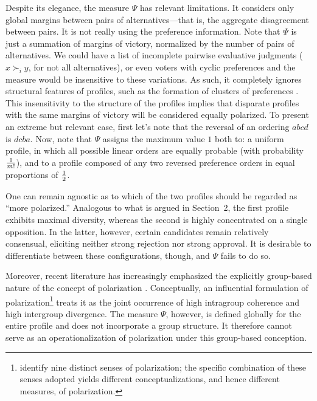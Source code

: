 \documentclass[12pt]{article}
\begin{document}
Despite its elegance, the measure \(\Psi\) has relevant limitations. It considers
only global margins between pairs of alternatives—that is, the aggregate
disagreement between pairs. It is not really using the preference information. Note that \(\Psi\) is just a summation of margins of victory, normalized by  the number of pairs of alternatives. We could have a list of incomplete pairwise evaluative judgments (\(x\succ_{i}y\), for not all alternatives), or even voters with cyclic preferences  and the measure would be insensitive to these variations. As such, it  completely ignores structural features of
profiles, such as the formation of clusters of preferences
\parencite{bramson16_disam_social_polar_concep_measur}. This insensitivity to the structure of the profiles implies that disparate profiles with the same margins of victory will be considered equally polarized. To present an extreme but relevant case, first let's note that the reversal of an ordering \( abcd \) is \( dcba \). Now,
note that \(\Psi\) assigns the maximum value \(1\) both to: a uniform profile, in
which all possible linear orders are equally probable (with probability \(1 \over {m!}\)), and to a profile
composed of any two reversed preference orders in equal proportions of \(1 \over 2\).

One can remain agnostic as to which of the two profiles should be regarded as
``more polarized.'' Analogous to what is argued in Section~2, the first profile
exhibits maximal diversity, whereas the second is highly concentrated on a
single opposition. In the latter, however, certain candidates remain
relatively consensual, eliciting neither strong rejection nor strong approval.
It is  desirable to differentiate between these configurations, though, and
\(\Psi\) fails to do so.

Moreover, recent literature has increasingly emphasized the explicitly
group-based nature of the concept of polarization
\parencite{mehlhaff23_group_based_approac_to_measur_polar,
  bramson2017understanding}. Conceptually, an influential formulation of
polarization\footnote{\textcite{bramson2017understanding, bramson16_disam_social_polar_concep_measur}
identify nine distinct senses of polarization; the specific combination of
these senses adopted yields different conceptualizations, and hence different
measures, of polarization.} treats it as the joint occurrence of high
intragroup coherence and high intergroup divergence. The measure \(\Psi\),
however, is defined globally for the entire profile and does not incorporate a
group structure. It therefore cannot serve as an operationalization of
polarization under this group-based conception.
\end{document}
